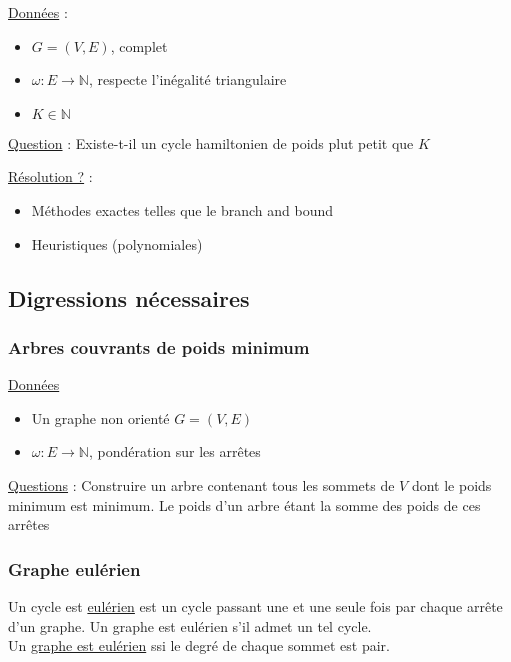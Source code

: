 \documentclass{article}
\begin{document}
        \underline{Données} :
          \begin{itemize}
            \item $G=(V, E)$, complet
            \item $\omega : E \to \mathbb{N}$, respecte l'inégalité triangulaire
            \item $K \in \mathbb{N}$
          \end{itemize}

        \underline{Question} :
            Existe-t-il un cycle hamiltonien de poids plut petit que $K$
        \vspace{5mm}

        \underline{Résolution ?} :
          \begin{itemize}
            \item Méthodes exactes telles que le branch and bound
            \item Heuristiques (polynomiales)
          \end{itemize}

    \subsection{Digressions nécessaires}


      \subsubsection{Arbres couvrants de poids minimum}

        \underline{Données}
        \begin{itemize}
          \item Un graphe non orienté $G = (V, E)$
          \item $\omega : E \to \mathbb{N}$, pondération sur les arrêtes
        \end{itemize}

        \underline{Questions} :
            Construire un arbre contenant tous les sommets de $V$ dont le poids
            minimum est minimum. Le poids d'un arbre étant la somme des poids de
            ces arrêtes

      \subsubsection{Graphe eulérien}

          Un cycle est \underline{eulérien} est un cycle passant une et une seule fois par
          chaque arrête d'un graphe. Un graphe est eulérien s'il admet un tel
          cycle.\\
          Un \underline{graphe est eulérien} ssi le degré de chaque sommet est pair.
\end{document}
